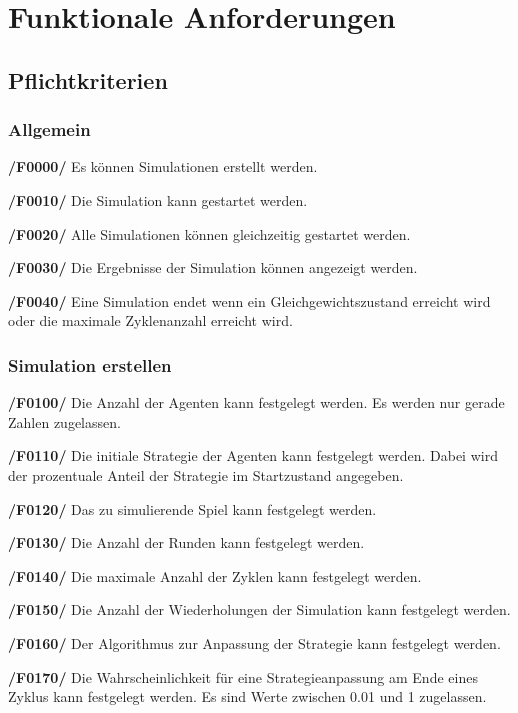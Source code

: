 \section{Funktionale Anforderungen}

\subsection{Pflichtkriterien}

\subsubsection{Allgemein}

\textbf{/F0000/}
Es können Simulationen erstellt werden.

\textbf{/F0010/} 
Die Simulation kann gestartet werden.

\textbf{/F0020/}
Alle Simulationen können gleichzeitig gestartet werden.

\textbf{/F0030/} 
Die Ergebnisse der Simulation können angezeigt werden.

\textbf{/F0040/}
Eine Simulation endet wenn ein Gleichgewichtszustand erreicht wird oder
die maximale Zyklenanzahl erreicht wird.

\subsubsection{Simulation erstellen}

\textbf{/F0100/} 
Die Anzahl der Agenten kann festgelegt werden. Es werden nur gerade Zahlen zugelassen.

\textbf{/F0110/} 
Die initiale Strategie der Agenten kann festgelegt werden. Dabei wird der prozentuale Anteil der Strategie im Startzustand angegeben.  

\textbf{/F0120/} 
Das zu simulierende Spiel kann festgelegt werden.

\textbf{/F0130/} 
Die Anzahl der Runden kann festgelegt werden.

\textbf{/F0140/} 
Die maximale Anzahl der Zyklen kann festgelegt werden.

\textbf{/F0150/} 
Die Anzahl der Wiederholungen der Simulation kann festgelegt werden.

\textbf{/F0160/} 
Der Algorithmus zur Anpassung der Strategie kann festgelegt werden.

\textbf{/F0170/} 
Die Wahrscheinlichkeit für eine Strategieanpassung am Ende eines Zyklus kann festgelegt werden. Es sind Werte zwischen 0.01 und 1 zugelassen.

